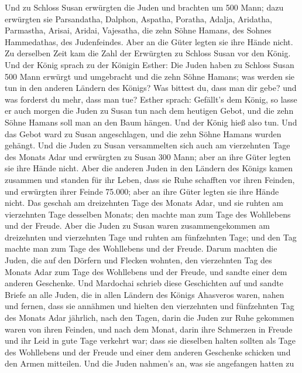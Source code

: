 Und zu Schloss Susan erwürgten die Juden und brachten um 500 Mann;
 dazu erwürgten sie Parsandatha, Dalphon, Aspatha,
 Poratha, Adalja, Aridatha,  Parmastha, Arisai,
Aridai, Vajesatha,  die zehn Söhne Hamans, des Sohnes
Hammedathas, des Judenfeindes. Aber an die Güter legten sie ihre Hände
nicht.  Zu derselben Zeit kam die Zahl der Erwürgten zu
Schloss Susan vor den König.  Und der König sprach zu der
Königin Esther: Die Juden haben zu Schloss Susan 500 Mann erwürgt und
umgebracht und die zehn Söhne Hamans; was werden sie tun in den anderen
Ländern des Königs? Was bittest du, dass man dir gebe? und was forderst
du mehr, dass man tue?  Esther sprach: Gefällt's dem König,
so lasse er auch morgen die Juden zu Susan tun nach dem heutigen Gebot,
und die zehn Söhne Hamans soll man an den Baum hängen.  Und
der König hieß also tun. Und das Gebot ward zu Susan angeschlagen, und
die zehn Söhne Hamans wurden gehängt.  Und die Juden zu
Susan versammelten sich auch am vierzehnten Tage des Monats Adar und
erwürgten zu Susan 300 Mann; aber an ihre Güter legten sie ihre Hände
nicht.  Aber die anderen Juden in den Ländern des Königs
kamen zusammen und standen für ihr Leben, dass sie Ruhe schafften vor
ihren Feinden, und erwürgten ihrer Feinde 75.000; aber an ihre Güter
legten sie ihre Hände nicht.  Das geschah am dreizehnten
Tage des Monats Adar, und sie ruhten am vierzehnten Tage desselben
Monats; den machte man zum Tage des Wohllebens und der Freude.
 Aber die Juden zu Susan waren zusammengekommen am
dreizehnten und vierzehnten Tage und ruhten am fünfzehnten Tage; und den
Tag machte man zum Tage des Wohllebens und der Freude. 
Darum machten die Juden, die auf den Dörfern und Flecken wohnten, den
vierzehnten Tag des Monats Adar zum Tage des Wohllebens und der Freude,
und sandte einer dem anderen Geschenke.  Und Mardochai
schrieb diese Geschichten auf und sandte Briefe an alle Juden, die in
allen Ländern des Königs Ahasveros waren, nahen und fernen,
 dass sie annähmen und hielten den vierzehnten und
fünfzehnten Tag des Monats Adar jährlich,  nach den Tagen,
darin die Juden zur Ruhe gekommen waren von ihren Feinden, und nach dem
Monat, darin ihre Schmerzen in Freude und ihr Leid in gute Tage verkehrt
war; dass sie dieselben halten sollten als Tage des Wohllebens und der
Freude und einer dem anderen Geschenke schicken und den Armen mitteilen.
 Und die Juden nahmen's an, was sie angefangen hatten zu
